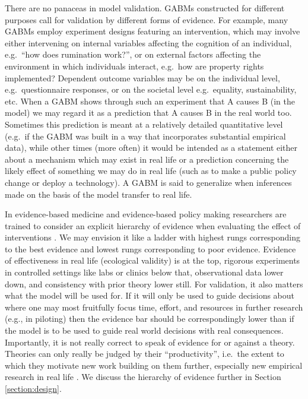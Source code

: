 \documentclass[11pt, a4paper, logo, twocolumn, internal, copyright, numbering]{googledeepmind}
\begin{document}
There are no panaceas in model validation. GABMs constructed for different purposes call for validation by different forms of evidence. For example, many GABMs employ experiment designs featuring an intervention, which may involve either intervening on internal variables affecting the cognition of an individual, e.g.~``how does rumination work?'', or on external factors affecting the environment in which individuals interact, e.g.~how are property rights implemented? Dependent outcome variables may be on the individual level, e.g.~questionnaire responses, or on the societal level e.g.~equality, sustainability, etc. When a GABM shows through such an experiment that A causes B (in the model) we may regard it as a prediction that A causes B in the real world too. Sometimes this prediction is meant at a relatively detailed quantitative level (e.g.~if the GABM was built in a way that incorporates substantial empirical data), while other times (more often) it would be intended as a statement either about a mechanism which may exist in real life or a prediction concerning the likely effect of something we may do in real life (such as to make a public policy change or deploy a technology). A GABM is said to generalize when inferences made on the basis of the model transfer to real life.

In evidence-based medicine and evidence-based policy making researchers are trained to consider an explicit hierarchy of evidence when evaluating the effect of interventions \citep{higgins2008cochrane}. We may envision it like a ladder with highest rungs corresponding to the best evidence and lowest rungs corresponding to poor evidence. Evidence of effectiveness in real life (ecological validity) is at the top, rigorous experiments in controlled settings like labs or clinics below that, observational data lower down, and consistency with prior theory lower still. For validation, it also matters what the model will be used for. If it will only be used to guide decisions about where one may most fruitfully focus time, effort, and resources in further research (e.g., in piloting) then the evidence bar should be correspondingly lower than if the model is to be used to guide real world decisions with real consequences. Importantly, it is not really correct to speak of evidence for or against a theory. Theories can only really be judged by their ``productivity'', i.e.~the extent to which they motivate new work building on them further, especially new empirical research in real life \citep{lakatos1970history}. We discuss the hierarchy of evidence further in Section \ref{section:design}.
\end{document}
